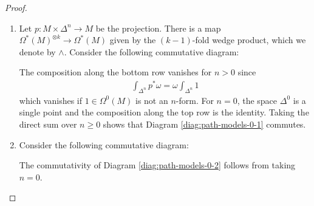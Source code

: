 \documentclass{scrartcl}
\theoremstyle{plain}
\theoremstyle{definition}
\newcommand{\Z}{\mathbb Z}
\DeclareMathOperator{\id}{id}
\DeclareMathOperator{\BC}{B}
\begin{document}
\begin{proof}
    \begin{enumerate}
        \item Let $p\colon M\times\Delta^n\to M$ be the projection. There is a map $\Omega^*(M)^{\otimes k}\to \Omega^*(M)$ given by the $(k-1)$-fold wedge product, which we denote by $\wedge$. Consider the following commutative diagram:
\begin{center}
\end{center}

The composition along the bottom row vanishes for $n>0$ since
\begin{align*}
    \int_{\Delta^n} p^*\omega = \omega \int_{\Delta^n} 1
\end{align*}
which vanishes if $1\in \Omega^0(M)$ is not an $n$-form. For $n=0$, the space $\Delta^0$ is a single point and the composition along the top row is the identity. Taking the direct sum over $n\geq 0$ shows that Diagram \ref{diag:path-models-0-1} commutes. 

\item Consider the following commutative diagram:
\begin{center}
\end{center}
The commutativity of Diagram \ref{diag:path-models-0-2} follows from taking $n=0$. 


\end{enumerate}
\end{proof}
\end{document}
